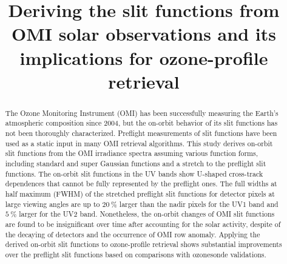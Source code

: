 \documentclass[amt,manuscript]{copernicus}
\begin{document}
\title{Deriving the slit functions from OMI solar observations and its implications for ozone-profile retrieval}












\received{}
\pubdiscuss{} %
\revised{}
\accepted{}
\published{}




\maketitle



\begin{abstract}
The Ozone Monitoring Instrument (OMI) has been successfully measuring the Earth's atmospheric composition since 2004, but the on-orbit behavior of its slit functions has not been thoroughly characterized. Preflight measurements of slit functions have been used as a static input in many OMI retrieval algorithms. This study derives on-orbit slit functions from the OMI irradiance spectra assuming various function forms, including standard and super Gaussian functions and a stretch to the preflight slit functions. The on-orbit slit functions in the UV bands show U-shaped cross-track dependences that cannot be fully represented by the preflight ones. The full widths at half maximum (FWHM) of the stretched preflight slit functions for detector pixels at large viewing angles are up to $20~\%$ larger than the nadir pixels for the UV1 band and $5~\%$ larger for the UV2 band. Nonetheless, the on-orbit changes of OMI slit functions are found to be insignificant over time after accounting for the solar activity, despite of the decaying of detectors and the occurrence of OMI row anomaly. Applying the derived on-orbit slit functions to ozone-profile retrieval shows substantial improvements over the preflight slit functions based on comparisons with ozonesonde validations.
\end{abstract}
\end{document}
